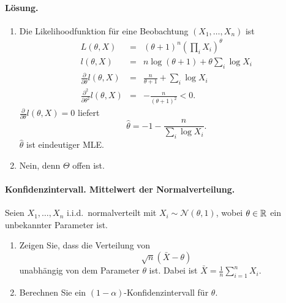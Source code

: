 \paragraph*{Lösung.}
\begin{enumerate}

    \item Die Likelihoodfunktion für eine Beobachtung $(X_1,\ldots,X_n)$ ist 
        \begin{eqnarray}
            L(\theta,X) &=& \left( \theta+1 \right)^n \left( \prod_i X_i \right)^{\theta}  \\
            l(\theta,X) &=& n \log \left( \theta+1 \right)  + \theta \sum_{i}^{} \log X_i \\
            \frac{\partial}{\partial \theta} l(\theta,X)&=& \frac{n}{\theta+1} + \sum_{i}^{} \log X_i \\
            \frac{\partial^2}{\partial \theta^2} l(\theta,X) &=& 
            - \frac{n}{\left( \theta+1 \right)^2} < 0.
        \end{eqnarray}
        $\frac{\partial}{\partial \theta} l(\theta,X)=0$ liefert
        \begin{equation}
            \hat\theta = -1 - \frac{n}{\sum_{i}^{} \log X_i}.
        \end{equation}
        $\hat\theta$ ist eindeutiger MLE.

    \item Nein, denn $\Theta$ offen ist.

\end{enumerate}







\paragraph{Konfidenzintervall. Mittelwert der Normalverteilung. }
Seien $X_1,\ldots,X_n$ i.i.d.\ normalverteilt mit $X_i \sim \mathcal N \left(\theta, 1 \right)$,
wobei $\theta\in\mathbb R$ ein unbekannter Parameter ist.
\begin{enumerate}
    \item Zeigen Sie, dass die Verteilung von 
        \begin{equation*}
            \sqrt{n}\left( \bar X -\theta \right)
        \end{equation*}
        unabhängig von dem Parameter $\theta$ ist. Dabei ist $\bar X = \frac{1}{n} \sum_{i=1}^{n} X_i$.
    \item Berechnen Sie ein $\left( 1-\alpha \right)$-Konfidenzintervall für $\theta$.
\end{enumerate}


